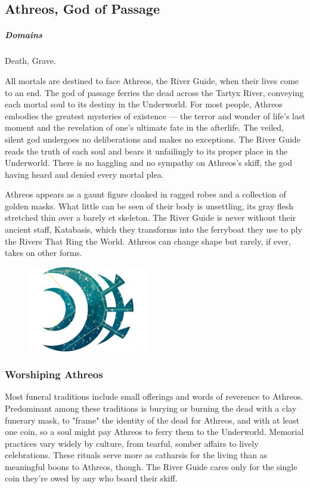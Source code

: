 \subsection*{Athreos, God of Passage} \label{ssec::athreos}
    \subparagraph{Domains} Death, Grave.

    All mortals are destined to face Athreos, the River Guide, when their lives come to an end.
    The god of passage ferries the dead across the Tartyx River, conveying each mortal soul to its destiny in the Underworld.
    For most people, Athreos embodies the greatest mysteries of existence --- the terror and wonder of life's last moment and the revelation of one's ultimate fate in the afterlife.
    The veiled, silent god undergoes no deliberations and makes no exceptions.
    The River Guide reads the truth of each soul and bears it unfailingly to its proper place in the Underworld.
    There is no haggling and no sympathy on Athreos's skiff, the god having heard and denied every mortal plea.

    Athreos appears as a gaunt figure cloaked in ragged robes and a collection of golden masks.
    What little can be seen of their body is unsettling, its gray flesh stretched thin over a barely et skeleton.
    The River Guide is never without their ancient staff, Katabasis, which they transforms into the ferryboat they use to ply the Rivers That Ring the World.
    Athreos can change shape but rarely, if ever, takes on other forms.

    \begin{figure}[t]
        \centering
        \includegraphics[width=0.47\textwidth]{02viphoger/img/10s_athreos.png}
    \end{figure}

    \subsubsection{Worshiping Athreos}
        Most funeral traditions include small offerings and words of reverence to Athreos.
        Predominant among these traditions is burying or burning the dead with a clay funerary mask, to "frame" the identity of the dead for Athreos, and with at least one coin, so a soul might pay Athreos to ferry them to the Underworld.
        Memorial practices vary widely by culture, from tearful, somber affairs to lively celebrations.
        These rituals serve more as catharsis for the living than as meaningful boons to Athreos, though.
        The River Guide cares only for the single coin they're owed by any who board their skiff.

